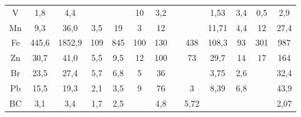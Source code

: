 \begin{tabular}{ccccccccccccc}
V         & 1,8        & 4,4        &                  &              & 10     & 3,2   &       &       & 1,53   & 3,4     & 0,5       & 2,9      \\
Mn        & 9,3        & 36,0       & 3,5              & 19           & 3      & 12    &       &       & 11,71  & 4,4     & 12        & 27,4     \\
Fe        & 445,6      & 1852,9     & 109              & 845          & 100    & 130   &       & 438   & 108,3  & 93      & 301       & 987      \\
Zn        & 30,7       & 41,0       & 5,5              & 9,5          & 12     & 100   &       & 73    & 29,7   & 14      & 17        & 164      \\
Br        & 23,5       & 27,4       & 5,7              & 6,8          & 5      & 36    &       &       & 3,75   & 2,6     &           & 32,4     \\
Pb        & 15,5       & 19,3       & 2,1              & 3,5          & 9      & 76    &       & 3     & 8,39   & 6,8     &           & 43,9     \\
BC        & 3,1        & 3,4        & 1,7              & 2,5          &        & 4,8   &       & 5,72  &        &         &           & 2,07    \\
\hline
\end{tabular}

